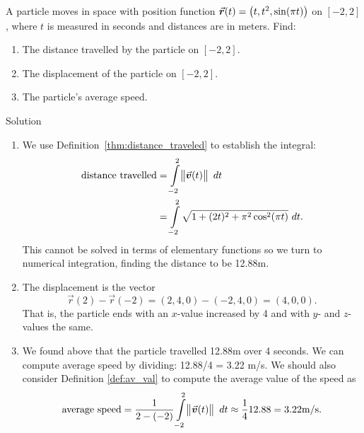 \begin{example}\label{ex_motion6}
A particle moves in space with position function $\vrt = \left( t,t^2,\sin (\pi t)\right)$ on $[-2,2]$, where $t$ is measured in seconds and distances are in meters. Find:
\begin{enumerate}
	\item The distance travelled by the particle on $[-2,2]$.
	\item	The displacement of the particle on $[-2,2]$.
	\item	The particle's average speed.
\end{enumerate}

Solution 

\begin{enumerate}
	\item We use Definition~\ref{thm:distance_traveled} to establish the integral:
	\begin{align*}
	\text{distance travelled} &= \int\limits_{-2}^2 \norm{\vvt}\ dt \\
							&= \int\limits_{-2}^2 \sqrt{1+(2t)^2+ \pi^2\cos^2(\pi t)}\ dt.
	\end{align*}
	This cannot be solved in terms of elementary functions so we turn to numerical integration, finding the distance to be 12.88m.
	
	\item		The displacement is the vector $$\vec r(2)-\vec r(-2) = \left( 2,4,0\right) - \left( -2,4,0\right) = \left( 4,0,0\right).$$ That is, the particle ends with an $x$-value increased by 4 and with $y$- and $z$-values the same.
	
	\item		We found above that the particle travelled 12.88m over 4 seconds. We can compute average speed by dividing: 12.88/4 = 3.22 m/s.
	We should also consider Definition \ref{def:av_val} to compute the average value of the speed as
	$$\text{average speed} = \frac{1}{2-(-2)}\int\limits_{-2}^2 \norm{\vvt}\ dt \approx \frac14 12.88 = 3.22\text{m/s}.$$


\end{enumerate}
\end{example}
